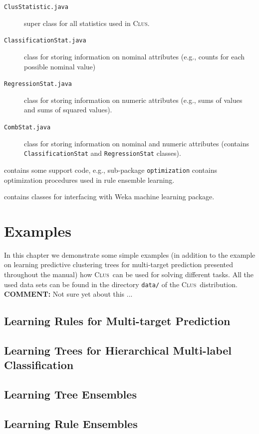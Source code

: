 \documentclass[a4paper]{report}
\newcommand{\clus}{\textsc{Clus}}
\newcommand{\comment}[1]{{\color{red}\textbf{COMMENT:} #1}}
\begin{document}
\begin{description}
	\begin{description}
		\item[\texttt{ClusStatistic.java}] super class for all statistics used in \clus.
		\item[\texttt{ClassificationStat.java}] class for storing information on nominal attributes (e.g., counts for each possible nominal value)
		\item[\texttt{RegressionStat.java}] class for storing information on numeric attributes (e.g., sums of values and sums of squared values).
		\item[\texttt{CombStat.java}] class for storing information on nominal and numeric attributes (contains \texttt{ClassificationStat} and \texttt{RegressionStat} classes).
	\end{description}
 	\item[\texttt{clus/tools}] contains some support code, e.g., sub-package \texttt{optimization} contains optimization procedures used in rule ensemble learning.
 	\item[\texttt{clus/weka}] contains classes for interfacing with Weka machine learning package.
\end{description}

\chapter{Examples}
In this chapter we demonstrate some simple examples (in addition to the example on learning predictive clustering trees for multi-target prediction presented throughout the manual) how \clus\ can be used for solving different tasks. All the used data sets can be found in the directory \texttt{data/} of the \clus\ distribution. 
\comment{Not sure yet about this ...}
\section{Learning Rules for Multi-target Prediction}
\section{Learning Trees for Hierarchical Multi-label Classification}
\section{Learning Tree Ensembles}
\section{Learning Rule Ensembles}
\end{document}
